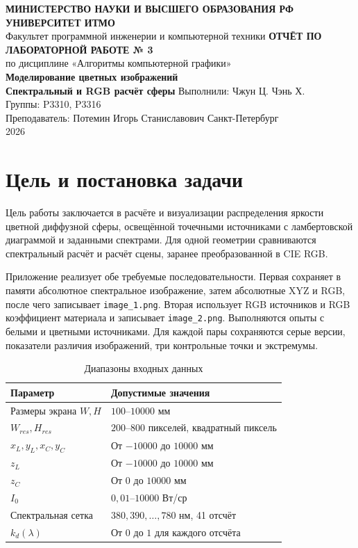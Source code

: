 \documentclass[a4paper,12pt]{article}
\newcommand{\code}[1]{\nolinkurl{#1}}
\begin{document}
\begin{titlepage}
  \thispagestyle{empty}
  \begin{center}
    \textbf{МИНИСТЕРСТВО НАУКИ И ВЫСШЕГО ОБРАЗОВАНИЯ РФ}\\[0.6em]
    \textbf{УНИВЕРСИТЕТ ИТМО}\\[0.6em]
    Факультет программной инженерии и компьютерной техники
    \vfill
    {\Large\bfseries ОТЧЁТ ПО ЛАБОРАТОРНОЙ РАБОТЕ № 3}\\[1.2em]
    {\large по дисциплине «Алгоритмы компьютерной графики»}\\[2em]
    {\Large\bfseries Моделирование цветных изображений\\[0.35em]
    Спектральный и RGB расчёт сферы}
    \vfill
    Выполнили: Чжун Ц. Чэнь Х.\\
    Группы: P3310, P3316\\
    Преподаватель: Потемин Игорь Станиславович
    \vfill
    Санкт-Петербург\\2026
  \end{center}
\end{titlepage}

\tableofcontents
\clearpage
\section{Цель и постановка задачи}

Цель работы заключается в расчёте и визуализации распределения яркости цветной диффузной сферы, освещённой точечными источниками с ламбертовской диаграммой и заданными спектрами. Для одной геометрии сравниваются спектральный расчёт и расчёт сцены, заранее преобразованной в CIE RGB.

Приложение реализует обе требуемые последовательности. Первая сохраняет в памяти абсолютное спектральное изображение, затем абсолютные XYZ и RGB, после чего записывает \code{image_1.png}. Вторая использует RGB источников и RGB коэффициент материала и записывает \code{image_2.png}. Выполняются опыты с белыми и цветными источниками. Для каждой пары сохраняются серые версии, показатели различия изображений, три контрольные точки и экстремумы.

\begin{table}[H]\centering\small
\caption{Диапазоны входных данных}
\begin{tabularx}{\textwidth}{@{}lX@{}}\toprule
Параметр & Допустимые значения\\\midrule
Размеры экрана $W,H$ & $100$--$10000$ мм\\
$W_{res},H_{res}$ & $200$--$800$ пикселей, квадратный пиксель\\
$x_L,y_L,x_C,y_C$ & От $-10000$ до $10000$ мм\\
$z_L$ & От $-10000$ до $10000$ мм\\
$z_C$ & От $0$ до $10000$ мм\\
$I_0$ & $0{,}01$--$10000$ Вт/ср\\
Спектральная сетка & $380,390,\ldots,780$ нм, 41 отсчёт\\
$k_d(\lambda)$ & От $0$ до $1$ для каждого отсчёта\\\bottomrule
\end{tabularx}
\end{table}
\end{document}
